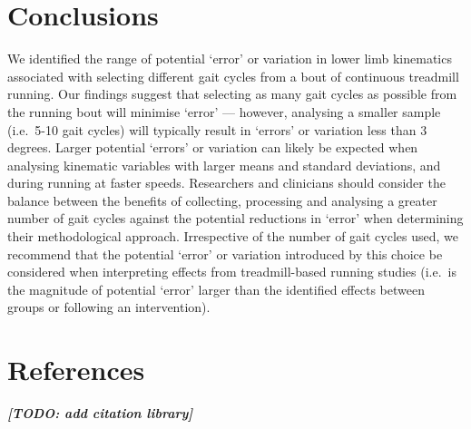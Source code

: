 \documentclass[]{elsarticle} %
\begin{document}
\hypertarget{conclusions}{%
\section{Conclusions}\label{conclusions}}

We identified the range of potential `error' or variation in lower limb
kinematics associated with selecting different gait cycles from a bout
of continuous treadmill running. Our findings suggest that selecting as
many gait cycles as possible from the running bout will minimise `error'
--- however, analysing a smaller sample (i.e.~5-10 gait cycles) will
typically result in `errors' or variation less than 3 degrees. Larger
potential `errors' or variation can likely be expected when analysing
kinematic variables with larger means and standard deviations, and
during running at faster speeds. Researchers and clinicians should
consider the balance between the benefits of collecting, processing and
analysing a greater number of gait cycles against the potential
reductions in `error' when determining their methodological approach.
Irrespective of the number of gait cycles used, we recommend that the
potential `error' or variation introduced by this choice be considered
when interpreting effects from treadmill-based running studies (i.e.~is
the magnitude of potential `error' larger than the identified effects
between groups or following an intervention).

\hypertarget{references}{%
\section{References}\label{references}}

\textbf{\emph{{[}TODO: add citation library{]}}}
\end{document}
